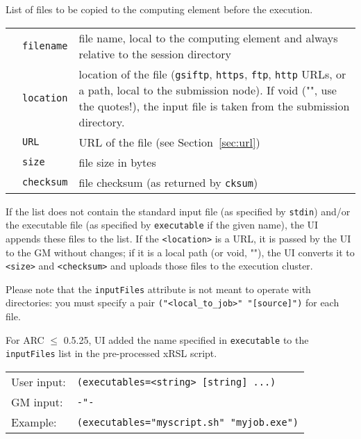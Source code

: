   List of files to be copied to the computing element before the
  execution.

  \begin{tabular}{llp{10cm}}
    \hspace*{1cm}&\texttt{filename} & file name, local to the computing element and
    always relative to the session directory\\
    \hspace*{1cm}&\texttt{location} & location of the file (\texttt{gsiftp},
    \texttt{https}, \texttt{ftp}, \texttt{http} URLs, or a path, local
    to the submission node). If void ("", use the quotes!), the input file is taken
    from the submission directory.\\
    \hspace*{1cm}&\texttt{URL} & URL of the file (see Section~\ref{sec:url})\\
    \hspace*{1cm}&\texttt{size} & file size in bytes\\
    \hspace*{1cm}&\texttt{checksum} & file checksum (as returned by \texttt{cksum})\\
  \end{tabular}

  If the list does not contain the standard input file (as specified
  by \texttt{stdin}) and/or the executable file (as specified by
  \texttt{executable} if the given name), the UI appends these files
  to the list. If the \verb#<location># is a URL, it is passed by the
  UI to the GM without changes; if it is a local path (or void, ""),
  the UI converts it to \verb#<size># and \verb#<checksum># and
  uploads those files to the execution cluster.

  \begin{framed}
  Please note that the \texttt{inputFiles} attribute is not meant to
  operate with directories: you must specify a pair
  \verb#("<local_to_job>" "[source]")# for each file.
  \end{framed}

  For ARC $\leq$ 0.5.25, UI added the name specified in \texttt{executable} to the 
  \texttt{inputFiles} list in the pre-processed xRSL script.

  \hspace*{0.5cm}
  \begin{shaded}
  \end{shaded}
  \begin{tabular}{lp{13cm}}
    User input:&\verb#(executables=<string> [string] ...)#\\
    GM input:&\verb#-"-#\\
    Example:&\verb#(executables="myscript.sh" "myjob.exe")#\\
  \end{tabular}

